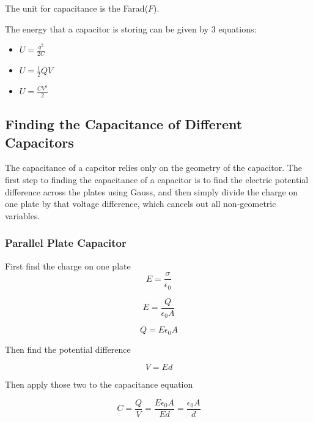\documentclass[a4paper,12pt]{article}
\begin{document}
		The unit for capacitance is the Farad($F$).

		The energy that a capacitor is storing can be given by 3 equations:
		\begin{itemize}
				\item $U = \frac{q^{2}}{2C}$
				\item $U = \frac{1}{2} QV$
				\item $U = \frac{CV^{2}}{2}$
		\end{itemize}

		\subsection{Finding the Capacitance of Different Capacitors}

			The capacitance of a capcitor relies only on the geometry of the capacitor. The first step to finding the capacitance of a capacitor is to find the electric potential difference across the plates using Gauss, and then simply divide the charge on one plate by that voltage difference, which cancels out all non-geometric variables.

			\subsubsection{Parallel Plate Capacitor}
				First find the charge on one plate
				\begin{equation*}
						E = \frac{\sigma}{\epsilon_{0}}
				\end{equation*}

				\begin{equation*}
						E = \frac{Q}{\epsilon_{0}A} 
				\end{equation*}

				\begin{equation*}
						Q = E\epsilon_{0}A
				\end{equation*}

				Then find the potential difference
				
				\begin{equation*}
						V = Ed
				\end{equation*}

				Then apply those two to the capacitance equation

				\begin{equation*}
						C = \frac{Q}{V} = \frac{E\epsilon_{0}A}{Ed} = \frac{\epsilon_{0}A}{d}
				\end{equation*}
\end{document}
